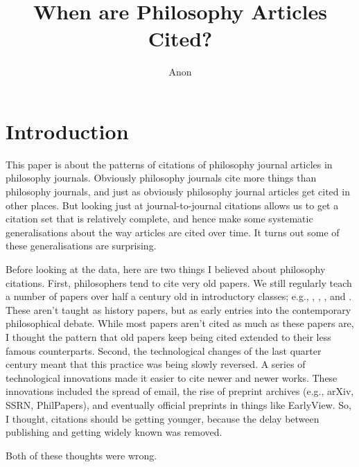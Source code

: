 \documentclass[
]{ergoclass}
\title{When are Philosophy Articles Cited?}
\author{Anon}
\affiliation{Anon Institution}
\begin{document}
\maketitle

\section{Introduction}\label{sec-introduction}

This paper is about the patterns of citations of philosophy journal
articles in philosophy journals. Obviously philosophy journals cite more
things than philosophy journals, and just as obviously philosophy
journal articles get cited in other places. But looking just at
journal-to-journal citations allows us to get a citation set that is
relatively complete, and hence make some systematic generalisations
about the way articles are cited over time. It turns out some of these
generalisations are surprising.

Before looking at the data, here are two things I believed about
philosophy citations. First, philosophers tend to cite very old papers.
We still regularly teach a number of papers over half a century old in
introductory classes; e.g., \citet{WOSA1969Y444700002},
\citet{WOSA1971Y116900003}, \citet{WOSA1972Z066400001}, and
\citet{10.2307_2025310}. These aren't taught as history papers, but as
early entries into the contemporary philosophical debate. While most
papers aren't cited as much as these papers are, I thought the pattern
that old papers keep being cited extended to their less famous
counterparts. Second, the technological changes of the last quarter
century meant that this practice was being slowly reversed. A series of
technological innovations made it easier to cite newer and newer works.
These innovations included the spread of email, the rise of preprint
archives (e.g., arXiv, SSRN, PhilPapers), and eventually official
preprints in things like EarlyView. So, I thought, citations should be
getting younger, because the delay between publishing and getting widely
known was removed.

Both of these thoughts were wrong.
\end{document}
